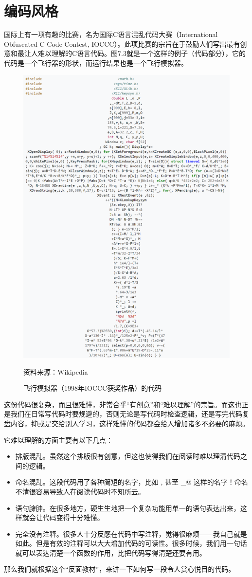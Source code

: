 \section{编码风格}
国际上有一项有趣的比赛，名为国际C语言混乱代码大赛（International Obfuscated C Code Contest, IOCCC）。此项比赛的宗旨在于鼓励人们写出最有创意和最让人难以理解的C语言代码。图7.3就是一个这样的例子（代码部分），它的代码是一个飞行器的形状，而运行结果也是一个飞行模拟器。\par
\begin{figure}[htbp]
    \centering
    \includegraphics[width=.8\textwidth]{../images/generalized_parts/07_international_obfuscated_c_code_contest_instance.png}
    \caption{飞行模拟器（1998年IOCCC获奖作品）的代码}
    \footnotesize{资料来源：Wikipedia}
\end{figure}
这份代码很复杂，而且很难懂，非常合乎``有创意''和``难以理解''的宗旨。而这也正是我们在日常写代码时要规避的，否则无论是写代码时检查逻辑，还是写完代码复盘内容，抑或是交给别人学习，这样难懂的代码都会给人增加诸多不必要的麻烦。\par
它难以理解的方面主要有以下几点：
\begin{itemize}
    \item 排版混乱。虽然这个排版很有创意，但这也使得我们在阅读时难以理清代码之间的逻辑。
    \item 命名混乱。这段代码用了各种简短的名字，比如 \lstinline@L@, \lstinline@o@ 甚至 \lstinline@_@ 这样的名字！命名不清很容易导致人在阅读代码时不知所云。
    \item 语句臃肿。在很多地方，硬生生地把一个复杂功能用单一的语句表达出来，这样就会让代码变得十分难懂。
    \item 完全没有注释。很多人十分反感在代码中写注释，觉得很麻烦——我自己就是如此。但是有效的注释可以大大增加代码的可读性。很多时候，我们用一句话就可以表达清楚一个函数的作用，比把代码写得清楚还要有用。
\end{itemize}
那么我们就根据这个``反面教材''，来讲一下如何写一段令人赏心悦目的代码。\par
